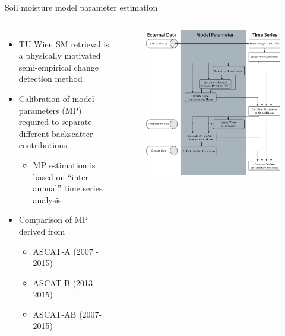 \documentclass[10pt,ignorenonframetext,xcolor={dvipsnames, table}]{beamer}
\providecommand{\tightlist}{%
\setlength{\itemsep}{0pt}\setlength{\parskip}{0pt}}
\begin{document}
\begin{frame}{Soil moisture model parameter estimation}

\begin{columns}


\begin{itemize}
\tightlist
\item
  TU Wien SM retrieval is a physically motivated semi-empirical change
  detection method
\item
  Calibration of model parameters (MP) required to separate different
  backscatter contributions

  \begin{itemize}
  \tightlist
  \item
    MP estimation is based on \enquote{inter-annual} time series
    analysis
  \end{itemize}
\item
  Comparison of MP derived from

  \begin{itemize}
  \tightlist
  \item
    ASCAT-A (2007 - 2015)
  \item
    ASCAT-B (2013 - 2015)
  \item
    ASCAT-AB (2007- 2015)
  \end{itemize}
\end{itemize}


\begin{figure}
\includegraphics[width=.75\textwidth]{./figures/warp.png}
\end{figure}

\end{columns}

\end{frame}
\end{document}
